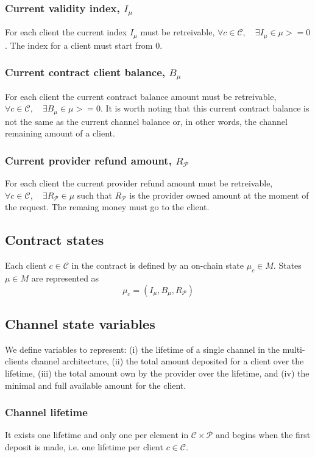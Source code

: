 \documentclass{llncs}
\begin{document}
\subsubsection{Current validity index, $I_\mu$} For each client the current index $I_\mu$ must be retreivable, $\forall c \in \mathcal{C}, \quad \exists I_\mu \in \mu >= 0$. The index for a client must start from $0$.

\subsubsection{Current contract client balance, $B_\mu$} For each client the current contract balance amount must be retreivable, $\forall c \in \mathcal{C}, \quad \exists B_\mu \in \mu >= 0$. It is worth noting that this current contract balance is not the same as the current channel balance or, in other words, the channel remaining amount of a client.

\subsubsection{Current provider refund amount, $R_\mathcal{P}$} For each client the current provider refund amount must be retreivable, $\forall c \in \mathcal{C}, \quad \exists R_\mathcal{P} \in \mu$ such that $R_\mathcal{P}$ is the provider owned amount at the moment of the request. The remaing money must go to the client.

\subsection{Contract states} Each client $c \in \mathcal{C}$ in the contract is defined by an on-chain state $\mu_c \in M$. States $\mu \in M$ are represented as
$$\mu_c = (I_\mu, B_\mu, R_\mathcal{P})$$

\subsection{Channel state variables} We define variables to represent: (i) the lifetime of a single channel in the multi-clients channel architecture, (ii) the total amount deposited for a client over the lifetime, (iii) the total amount own by the provider over the lifetime, and (iv) the minimal and full available amount for the client.

\subsubsection{Channel lifetime} It exists one lifetime and only one per element in $\mathcal{C} \times \mathcal{P}$ and begins when the first deposit is made, i.e. one lifetime per client $c \in \mathcal{C}$.
\end{document}

